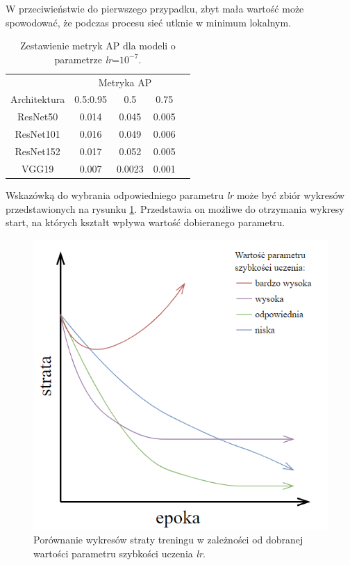 \hspace{0.5cm}
W przeciwieństwie do pierwszego przypadku, zbyt mała wartość może spowodować, że podczas procesu sieć utknie w minimum lokalnym.
\begin{table}[H]
    \centering
    \caption{Zestawienie metryk AP dla modeli o parametrze \emph{lr}=$10^{-7}$.}
    \begin{tabular}{|c||c|c|c|c|}
    \hline
        &\multicolumn{3}{c|}{Metryka AP}\\ \cline{2-4}
        Architektura & 0.5:0.95&0.5&0.75\\ \hline \hline
        ResNet50 & 0.014 & 0.045 & 0.005 \\ \hline
        ResNet101 & 0.016 & 0.049 & 0.006 \\ \hline
        ResNet152 & 0.017 & 0.052 & 0.005 \\ \hline
        VGG19 & 0.007 & 0.0023 & 0.001 \\ \hline
    \end{tabular}
    \label{tab:ap_lr7}
\end{table}

\newpage
\hspace{0.5cm}
Wskazówką do wybrania odpowiedniego parametru \emph{lr} może być zbiór wykresów przedstawionych na rysunku \ref{fig:lr_teor}. Przedstawia on możliwe do otrzymania wykresy start, na których kształt wpływa wartość dobieranego parametru.

\begin{figure}[H]
    \centering
    \includegraphics[width=0.5\linewidth]{Obrazy/Rozdzial05/learning/lr.png}
    \caption{Porównanie wykresów straty treningu w zależności od dobranej wartości parametru szybkości uczenia \emph{lr}.}
    \label{fig:lr_teor}
\end{figure}

